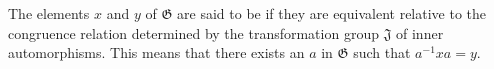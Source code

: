 The elements $x$ and $y$ of $\mathfrak{G}$ are said to be  if they are equivalent relative to the congruence relation determined by the transformation group $\mathfrak{J}$ of inner automorphisms. This means that there exists an $a$ in $\mathfrak{G}$ such that $a^{-1}xa = y$.
